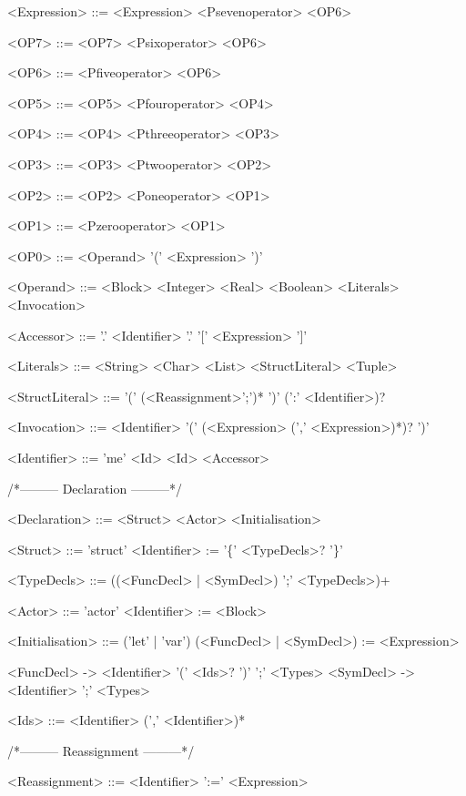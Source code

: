 \begin{grammar}
<Expression> ::= <Expression> <Psevenoperator> <OP6>

<OP7> ::= <OP7> <Psixoperator> <OP6>

<OP6> ::= <Pfiveoperator> <OP6>

<OP5> ::= <OP5> <Pfouroperator> <OP4>

<OP4> ::= <OP4> <Pthreeoperator> <OP3>

<OP3> ::= <OP3> <Ptwooperator> <OP2>

<OP2> ::= <OP2> <Poneoperator> <OP1>

<OP1> ::= <Pzerooperator> <OP1>

<OP0> ::= <Operand>
 \alt '(' <Expression> ')'

<Operand> ::= <Block>
 \alt <Integer>
 \alt <Real>
 \alt <Boolean>
 \alt <Literals>
 \alt <Invocation>

<Accessor> ::= '.' <Identifier>
 \alt '.' '[' <Expression> ']'

<Literals> ::= <String>
 \alt <Char>
 \alt <List>
 \alt <StructLiteral>
 \alt <Tuple>

<StructLiteral> ::= '(' (<Reassignment>';')* ')' (':' <Identifier>)?

<Invocation> ::= <Identifier> '(' (<Expression> (',' <Expression>)*)? ')'

<Identifier> ::= 'me'
 \alt <Id>
 \alt <Id> <Accessor>

\end{grammar}
/*--------- Declaration ---------*/
\begin{grammar}
<Declaration> ::= <Struct>
 \alt <Actor>
 \alt <Initialisation>

<Struct> ::= 'struct' <Identifier> := '\{' <TypeDecls>? '\}'

<TypeDecls> ::= ((<FuncDecl> | <SymDecl>) ';' <TypeDecls>)+

<Actor> ::= 'actor' <Identifier> := <Block>

<Initialisation> ::= ('let' | 'var') (<FuncDecl> | <SymDecl>) := <Expression>

<FuncDecl> -> <Identifier> '(' <Ids>? ')' ';' <Types>
<SymDecl> -> <Identifier> ';' <Types>

<Ids> ::= <Identifier> (',' <Identifier>)*

\end{grammar}
/*--------- Reassignment ---------*/
\begin{grammar}
<Reassignment> ::= <Identifier> ':=' <Expression>
\end{grammar}
